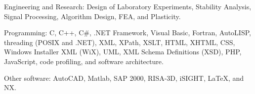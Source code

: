 \documentclass{resume}
\begin{document}
    
    
    
    
    
    
	
	
    
    
    

	
    \begin{bulletedlist}
		
        \item Engineering and Research: Design of Laboratory Experiments,
                        Stability Analysis,
                        Signal Processing,
                        Algorithm Design,
                        FEA,
                        and Plasticity.
                        
        \item Programming: C,
                        C++,
                        C\#,
                        .NET Framework,
                        Visual Basic,
                        Fortran,
                        AutoLISP,
                        threading (POSIX and .NET),
                        XML,
                        XPath,
                        XSLT,
                        HTML,
                        XHTML,
                        CSS,
                        Windows Installer XML (WiX),
                        UML,
                        XML Schema Definitions (XSD),
                        PHP,
                        JavaScript,
                        code profiling,
                        and software architecture.
                        
        \item Other software: AutoCAD,
                        Matlab,
                        SAP 2000,
                        RISA-3D,
                        iSIGHT,
                        LaTeX,
                        and NX.
                        
	\end{bulletedlist}
	
\end{document}
